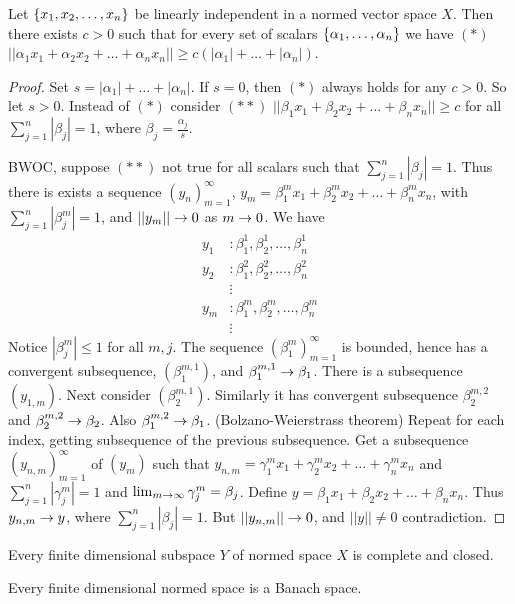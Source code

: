 \documentclass[]{article}
\begin{document}
\begin{lemma}
	Let $\left\{ x_1,x_2,\dots,x_n \right\}$ be linearly independent in a normed vector space $X$.
	Then there exists $c>0$ such that for every set of scalars $\left\{ \alpha_1,\dots,\alpha_n \right\}$ we have $(*)$ $||\alpha_1x_1+\alpha_2x_2+\dots+\alpha_nx_n|| \geq c(|\alpha_1|+\dots+|\alpha_n|)$.
\end{lemma}
\begin{proof}
	Set $s = |\alpha_1|+\dots+|\alpha_n|$. If $s=0$, then $(*)$ always holds for any $c>0$.
	So let $s>0$. Instead of $(*)$ consider $(**)$ $||\beta_1x_1+\beta_2x_2+\dots+\beta_nx_n||\geq c$ for all $\sum_{j=1}^n|\beta_j| = 1$, where $\beta_j = \frac{\alpha_j}s$.

	BWOC, suppose $(**)$ not true for all scalars such that $\sum_{j=1}^n|\beta_j| = 1$.
	Thus there is exists a sequence $(y_n)_{m=1}^\infty$, $y_m = \beta_1^m x_1 + \beta_2^m x_2 + \dots + \beta_n^m x_n$, with $\sum_{j=1}^n|\beta_j^m| = 1$, and $||y_m||\rightarrow0$ as $m\rightarrow 0$.
	We have
	\begin{align*}
		y_1 &: \beta_1^1, \beta_2^1,\dots,\beta_n^1 \\
		y_2 &: \beta_1^2, \beta_2^2,\dots,\beta_n^2 \\
			&\vdots \\
		y_m &: \beta_1^m,\beta_2^m,\dots,\beta_n^m \\
			&\vdots
	\end{align*}
	Notice $|\beta_j^m|\leq 1$ for all $m,j$. The sequence $(\beta_1^m)_{m=1}^\infty$ is bounded, hence has a convergent subsequence, $(\beta_1^{m,1})$, and $\beta_1^{m,1}\rightarrow\beta_1$.
	There is a subsequence $(y_{1,m})$.
	Next consider $(\beta_2^{m,1})$.
	Similarly it has convergent subsequence $\beta_2^{m,2}$ and $\beta_2^{m,2}\rightarrow\beta_2$.
	Also $\beta_1^{m,2}\rightarrow\beta_1$. (Bolzano-Weierstrass theorem) Repeat for each index, getting subsequence of the previous subsequence.
	Get a subsequence $(y_{n,m})_{m=1}^\infty$ of $(y_m)$ such that $y_{n,m} = \gamma_1^mx_1 + \gamma_2^mx_2 + \dots + \gamma_n^mx_n$ and $\sum_{j=1}^n|\gamma_j^m|=1$ and $\lim_{m\rightarrow\infty}\gamma_j^m = \beta_j$.
	Define $y = \beta_1x_1+\beta_2x_2+\dots+\beta_nx_n$.
	Thus $y_{n,m}\rightarrow y$, where $\sum_{j=1}^n |\beta_j| = 1$.
	But $||y_{n,m}||\rightarrow0$, and $||y||\neq0$ contradiction.
\end{proof}

\begin{theorem}
	Every finite dimensional subspace $Y$ of normed space $X$ is complete and closed.
\end{theorem}
\begin{corollary}
	Every finite dimensional normed space is a Banach space.
\end{corollary}
\end{document}
